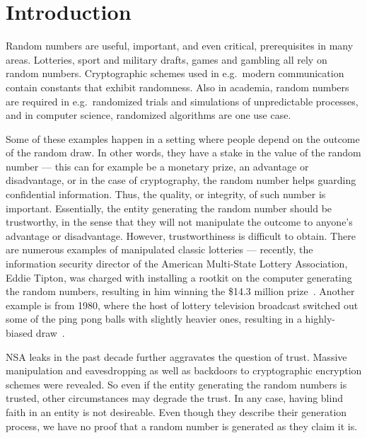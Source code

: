 \section{Introduction}\label{cha:introduction}

Random numbers are useful, important, and even critical, prerequisites in many areas. Lotteries, sport and military drafts, games and gambling all rely on random numbers. Cryptographic schemes used in e.g.\ modern communication contain constants that exhibit randomness. Also in academia, random numbers are required in e.g.\ randomized trials and simulations of unpredictable processes, and in computer science, randomized algorithms are one use case.

Some of these examples happen in a setting where people depend on the outcome of the random draw. In other words, they have a stake in the value of the random number --- this can for example be a monetary prize, an advantage or disadvantage, or in the case of cryptography, the random number helps guarding confidential information. Thus, the quality, or integrity, of such number is important. Essentially, the entity generating the random number should be trustworthy, in the sense that they will not manipulate the outcome to anyone's advantage or disadvantage. However, trustworthiness is difficult to obtain. There are numerous examples of manipulated classic lotteries --- recently, the information security director of the American Multi-State Lottery Association, Eddie Tipton, was charged with installing a rootkit on the computer generating the random numbers, resulting in him winning the \$14.3 million prize~\cite{bbclotteryexploit}. Another example is from 1980, where the host of lottery television broadcast switched out some of the ping pong balls with slightly heavier ones, resulting in a highly-biased draw~\cite{nickperry-lotteryexploit}.

NSA leaks in the past decade further aggravates the question of trust. Massive manipulation and eavesdropping as well as backdoors to cryptographic encryption schemes were revealed. So even if the entity generating the random numbers is trusted, other circumstances may degrade the trust. In any case, having blind faith in an entity is not desireable. Even though they describe their generation process, we have no proof that a random number is generated as they claim it is.


